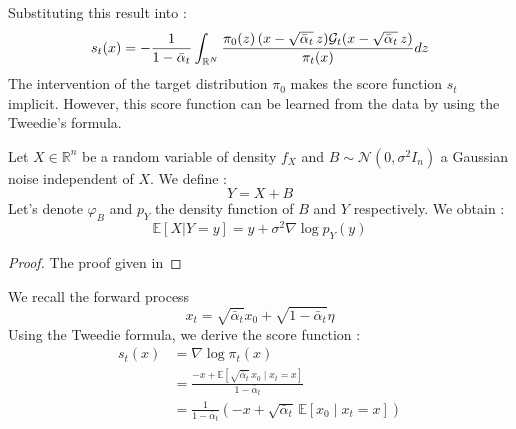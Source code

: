 \documentclass[a4paper,10pt]{article}
\begin{document}
Substituting this result into  :
\begin{equation}\label{eq:score_formule_analytique}
    s_t(x) = -\frac{1}{1- \bar \alpha_t} \int_{\mathbb{R}^N} \frac{\pi_0(z)\, (x - \sqrt{\bar \alpha_t} \,z) \mathcal{G}_t(x - \sqrt{\bar \alpha_t} \,z)}{\pi_t(x)} dz
\end{equation}
The intervention of the target distribution $\pi_0$ makes the score function $s_t$ implicit. However, this score function can be learned from the data by using the Tweedie's formula.
\begin{theorem}\label{theo:formule_de_Tweedie}
    Let $X \in \mathbb{R}^n$ be a random variable of density $f_X$ and $B \sim \mathcal{N}(0, \sigma^2 I_n)$ a Gaussian noise independent of $X$. We define :
    \[ Y = X + B \]
    Let's denote $\varphi_B$ and $p_Y$ the density function of $B$ and $Y$ respectively. We obtain :
    \[ \mathbb{E}[X | Y = y] = y + \sigma^2 \nabla \log p_Y(y) \]
\end{theorem}
\begin{proof}
    The proof given in 
\end{proof}
We recall the forward process
\[ x_t = \sqrt{\bar \alpha_t} x_0 + \sqrt{1 - \bar \alpha_t} \eta \]
Using the  Tweedie formula, we derive the score function :
\begin{align*}
s_t(x) &= \nabla \log \pi_t(x) \\
&= \frac{-x + \mathbb{E} \left[\sqrt{\bar \alpha_t}\, x_0 \mid x_t = x \right]}{1 - \bar \alpha_t} \\
&= \frac{1}{1 - \bar \alpha_t} \left( -x + \sqrt{\bar \alpha_t} \,\mathbb{E} \left[ x_0 \mid x_t = x \right] \right)
\end{align*}
\end{document}
